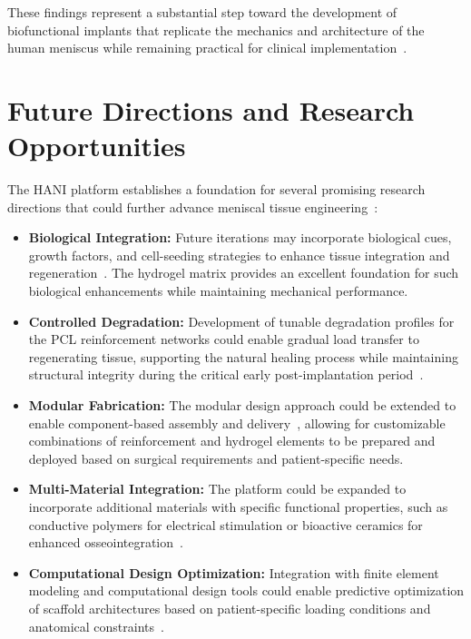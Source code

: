 These findings represent a substantial step toward the development of biofunctional implants that replicate the mechanics and architecture of the human meniscus while remaining practical for clinical implementation~\cite{gupta2020meniscaltissue}.

\section{Future Directions and Research Opportunities}

The HANI platform establishes a foundation for several promising research directions that could further advance meniscal tissue engineering~\cite{garreta2017tissueengineering}:

\begin{itemize}
    \item \textbf{Biological Integration:} Future iterations may incorporate biological cues, growth factors, and cell-seeding strategies to enhance tissue integration and regeneration~\cite{gupta2020meniscaltissue}. The hydrogel matrix provides an excellent foundation for such biological enhancements while maintaining mechanical performance.
    
    \item \textbf{Controlled Degradation:} Development of tunable degradation profiles for the PCL reinforcement networks could enable gradual load transfer to regenerating tissue, supporting the natural healing process while maintaining structural integrity during the critical early post-implantation period~\cite{elkommos2025hybridhydrogels}.
    
    \item \textbf{Modular Fabrication:} The modular design approach could be extended to enable component-based assembly and delivery~\cite{filardo2019patientspecificmeniscus}, allowing for customizable combinations of reinforcement and hydrogel elements to be prepared and deployed based on surgical requirements and patient-specific needs.
    
    \item \textbf{Multi-Material Integration:} The platform could be expanded to incorporate additional materials with specific functional properties, such as conductive polymers for electrical stimulation or bioactive ceramics for enhanced osseointegration~\cite{ngo2018additivemanufacturing}.
    
    \item \textbf{Computational Design Optimization:} Integration with finite element modeling and computational design tools could enable predictive optimization of scaffold architectures based on patient-specific loading conditions and anatomical constraints~\cite{ateshian2015patientspecificarticular}.
    

\end{itemize}
